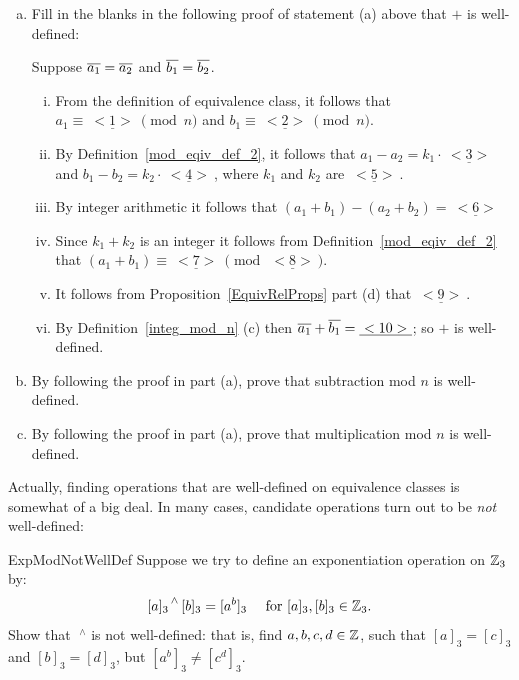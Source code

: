 \begin{exercise}{54} 
\begin{enumerate}[(a)]
\item 
Fill in the blanks in the following proof of statement (a) above that $\mathbin{+}$ is well-defined: 

Suppose $\overline{a_1} = \overline{a_2}$ and $\overline{b_1} = \overline{b_2}$. 
\begin{enumerate}[(i)]
\item
From the definition of equivalence class, it follows that  $a_1 \equiv \underline{~<1>~} \pmod{n}$ and $b_1 \equiv \underline{~<2>~} \pmod{n}$. 
\item  
By Definition~\ref{mod_eqiv_def_2}, it follows that 
$a_1 - a_2 = k_1 \cdot \underline{~<3>~}$ and $b_1 - b_2 = k_2 \cdot \underline{~<4>~}$, where $k_1$ and $k_2$ are $\underline{~<5>~}$. 
\item
By integer arithmetic it follows that $(a_1 + b_1) - (a_2 + b_2) =  \underline{~<6>~}$
\item
Since $k_1 + k_2$ is an integer it follows from Definition~\ref{mod_eqiv_def_2} that $(a_1 + b_1) \equiv \underline{~<7>~} \pmod{\underline{~<8>~}}$.
\item 
It follows from Proposition~\ref{EquivRelProps} part (d) that $\underline{~<9>~}$.
\item
By Definition~\ref{integ_mod_n} (c) then $\overline{a_1} \mathbin{+} \overline{b_1} =  \underline{~<10>~}$; so $\mathbin{+}$ is well-defined.
\end{enumerate}
\item By following the proof in part (a), prove that subtraction mod $n$ is well-defined.
\item By following the proof in part (a), prove that multiplication mod $n$ is well-defined.
\end{enumerate}
\end{exercise}

Actually, finding operations that are well-defined on equivalence classes is somewhat of a big deal. In many cases, candidate operations turn out to be \emph{not} well-defined:

\begin{exercise}{ExpModNotWellDef}
Suppose we try to define an exponentiation operation on $\mathbb{Z}_3$ by:
\[
 {[a]_3}^{\,\wedge} \, [b]_3 = [a^b]_3 \quad \text{ for } [a]_3, [b]_3 \in \mathbb{Z}_3. \]
Show that $\;^{\wedge}$ is not well-defined: that is, find $a, b, c, d \in \mathbb{Z}$, such that $[a]_3 = [c]_3$ and $[b]_3 = [d]_3$, but $\left[a^b \right]_3 \neq \left[c^d \right]_3$.
\end{exercise}

